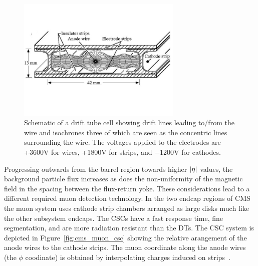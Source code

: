 \begin{figure}[htbp]
\centering
     \includegraphics[width=0.7\textwidth]{cms_and_lhc/plots/cms_muon_dt.jpg}
     \caption{
Schematic of a drift tube cell showing drift lines leading to/from the wire 
and isochrones three of which are seen as the concentric lines surrounding the wire. The voltages applied to the 
electrodes are +3600V for wires, +1800V for strips, and −1200V for cathodes.
     }
     \label{fig:cms_muon_dt}
\end{figure}

Progressing outwards from the barrel region towards higher $\lvert\eta\rvert$ values, the background 
particle flux increases as does the non-uniformity of the magnetic field in the spacing between
the flux-return yoke. These considerations lead to a different required muon detection technology.
In the two endcap regions of CMS the muon system uses cathode strip chambers arranged as large
disks much like the other subsystem endcaps. The CSCs have a fast 
response time, fine segmentation, and are more radiation resistant than the DTs. The CSC system
is depicted in Figure~\ref{fig:cms_muon_csc} showing the relative arangement of the anode
wires to the cathode strips. The muon coordinate along the anode wires (the $\phi$ coodinate) 
is obtained by interpolating charges induced on strips~\cite{cms-csc}.


